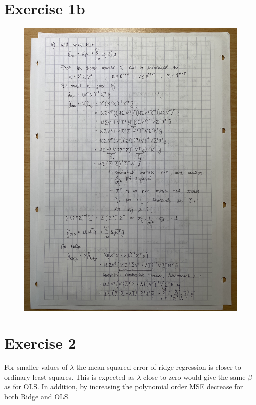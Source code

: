 \documentclass[english,notitlepage]{revtex4-1}  %
\begin{document}
\section*{Exercise 1b}
\begin{figure}[H]
    \centering
    \includegraphics[angle=-90, width=\linewidth]{Week 36/36_2.jpg}
\end{figure}

\section*{Exercise 2}
For smaller values of $\lambda$ the mean squared error of ridge regression is closer to ordinary least squares. This is expected as $\lambda$ close to zero would give the same $\beta$ as for OLS.
In addition, by increasing the polynomial order MSE decrease for both Ridge and OLS.


\end{document}
